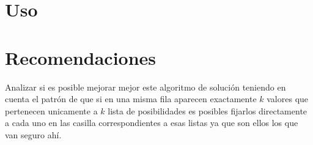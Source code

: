 \documentclass[a4paper,10pt,twocolumn]{article}
\begin{document}
   



\section{Uso }

\section{Recomendaciones}\label{sec:rec}

Analizar si es posible mejorar mejor este algoritmo de solución teniendo en cuenta el patrón de que si en una misma fila aparecen exactamente $k $ valores que pertenecen unicamente a $k$ lista de posibilidades es posibles fijarlos directamente a cada uno en las casilla correspondientes a esas listas ya que son ellos los que van seguro ahí.   







\label{end}
\end{document}
